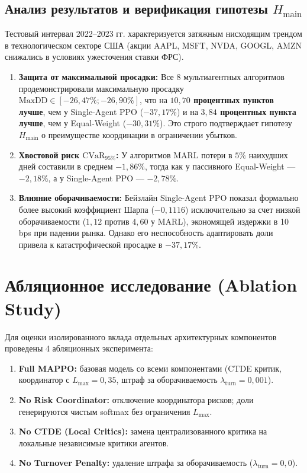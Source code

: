 \documentclass[11pt,a4paper]{article}
\begin{document}
\subsection{Анализ результатов и верификация гипотезы \texorpdfstring{$H_{\text{main}}$}{H\_main}}

Тестовый интервал 2022--2023 гг. характеризуется затяжным нисходящим трендом в технологическом секторе США (акции AAPL, MSFT, NVDA, GOOGL, AMZN снижались в условиях ужесточения ставки ФРС).
\begin{enumerate}[leftmargin=*]
\item \textbf{Защита от максимальной просадки:} Все 8 мультиагентных алгоритмов продемонстрировали максимальную просадку $\text{MaxDD} \in [-26{,}47\%; -26{,}90\%]$, что на \textbf{$10{,}70$ процентных пунктов лучше}, чем у Single-Agent PPO ($-37{,}17\%$) и на \textbf{$3{,}84$ процентных пункта лучше}, чем у Equal-Weight ($-30{,}31\%$). Это строго подтверждает гипотезу $H_{\text{main}}$ о преимуществе координации в ограничении убытков.
\item \textbf{Хвостовой риск $\text{CVaR}_{95\%}$:} У алгоритмов MARL потери в $5\%$ наихудших дней составили в среднем $-1{,}86\%$, тогда как у пассивного Equal-Weight --- $-2{,}18\%$, а у Single-Agent PPO --- $-2{,}78\%$.
\item \textbf{Влияние оборачиваемости:} Бейзлайн Single-Agent PPO показал формально более высокий коэффициент Шарпа ($-0{,}1116$) исключительно за счет низкой оборачиваемости ($1{,}12$ против $4{,}60$ у MARL), экономящей издержки в 10 bps при падении рынка. Однако его неспособность адаптировать доли привела к катастрофической просадке в $-37{,}17\%$.
\end{enumerate}

\section{Абляционное исследование (Ablation Study)}

Для оценки изолированного вклада отдельных архитектурных компонентов проведены 4 абляционных эксперимента:
\begin{enumerate}[leftmargin=*]
\item \textbf{Full MAPPO:} базовая модель со всеми компонентами (CTDE критик, координатор с $L_{\max} = 0{,}35$, штраф за оборачиваемость $\lambda_{\text{turn}} = 0{,}001$).
\item \textbf{No Risk Coordinator:} отключение координатора рисков; доли генерируются чистым softmax без ограничения $L_{\max}$.
\item \textbf{No CTDE (Local Critics):} замена централизованного критика на локальные независимые критики агентов.
\item \textbf{No Turnover Penalty:} удаление штрафа за оборачиваемость ($\lambda_{\text{turn}} = 0{,}0$).
\end{enumerate}
\end{document}
